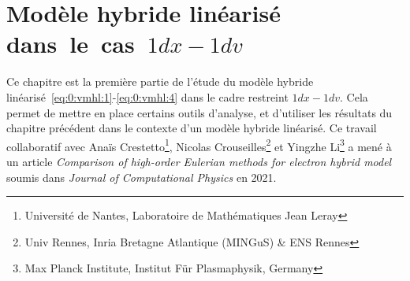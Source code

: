 \renewcommand{\localPath}{chap2}

\chapter{Modèle hybride linéarisé dans~le~cas~$1dx-1dv$}
\label{chap2}

Ce chapitre est la première partie de l'étude du modèle hybride linéarisé~\eqref{eq:0:vmhl:1}-\eqref{eq:0:vmhl:4} dans le cadre restreint $1dx-1dv$. Cela permet de mettre en place certains outils d'analyse, et d'utiliser les résultats du chapitre précédent dans le contexte d'un modèle hybride linéarisé. Ce travail collaboratif avec Anaïs Crestetto\footnote{Université de Nantes, Laboratoire de Mathématiques Jean Leray}, Nicolas Crouseilles\footnote{Univ Rennes, Inria Bretagne Atlantique (MINGuS) \& ENS Rennes} et Yingzhe Li\footnote{Max Planck Institute, Institut Für Plasmaphysik, Germany} a mené à un article \emph{Comparison of high-order Eulerian methods for electron hybrid model} soumis dans \emph{Journal of Computational Physics} en 2021.



%






\begin{subappendices}

\end{subappendices}

